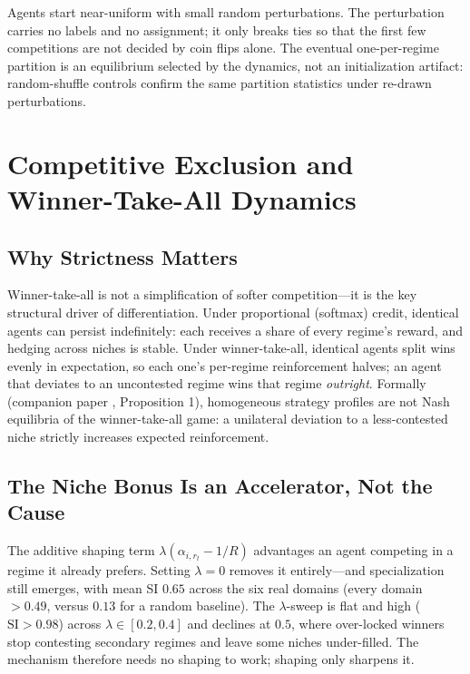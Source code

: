 \documentclass[10pt]{article}
\newcommand{\SI}{\mathrm{SI}}
\begin{document}
Agents start near-uniform with small random perturbations. The perturbation
carries no labels and no assignment; it only breaks ties so that the first few
competitions are not decided by coin flips alone. The eventual one-per-regime
partition is an equilibrium selected by the dynamics, not an initialization
artifact: random-shuffle controls confirm the same partition statistics under
re-drawn perturbations.

\section{Competitive Exclusion and Winner-Take-All Dynamics}

\subsection{Why Strictness Matters}

Winner-take-all is not a simplification of softer competition---it is the key
structural driver of differentiation. Under proportional (softmax) credit,
identical agents can persist indefinitely: each receives a share of every
regime's reward, and hedging across niches is stable. Under winner-take-all,
identical agents split wins evenly in expectation, so each one's per-regime
reinforcement halves; an agent that deviates to an uncontested regime wins that
regime \emph{outright}. Formally (companion paper \cite{li2026emergent},
Proposition 1), homogeneous
strategy profiles are not Nash equilibria of the winner-take-all game: a
unilateral deviation to a less-contested niche strictly increases expected
reinforcement.

\subsection{The Niche Bonus Is an Accelerator, Not the Cause}

The additive shaping term $\lambda(\alpha_{i,r_t} - 1/R)$ advantages an agent
competing in a regime it already prefers. Setting $\lambda = 0$ removes it
entirely---and specialization still emerges, with mean SI $0.65$ across the six
real domains (every domain $> 0.49$, versus $0.13$ for a random baseline). The
$\lambda$-sweep is flat and high ($\SI > 0.98$) across $\lambda \in [0.2,0.4]$
and declines at $0.5$, where over-locked winners stop contesting secondary
regimes and leave some niches under-filled. The mechanism therefore needs no
shaping to work; shaping only sharpens it.
\end{document}

